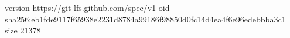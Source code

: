 version https://git-lfs.github.com/spec/v1
oid sha256:eb1fde9117f65938e2231d8784a99186f98850d0fc14d4ea4f6e96edebbba3c1
size 21378
